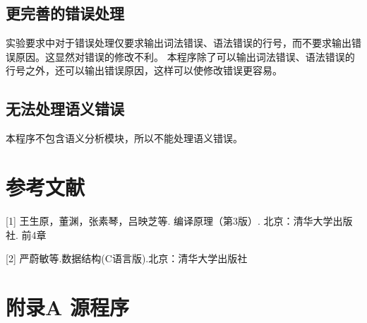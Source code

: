 \documentclass[supercite]{Experimental_Report}
\theoremstyle{definition}
\begin{document}
\subsection{更完善的错误处理}
实验要求中对于错误处理仅要求输出词法错误、语法错误的行号，而不要求输出错误原因。这显然对错误的修改不利。
本程序除了可以输出词法错误、语法错误的行号之外，还可以输出错误原因，这样可以使修改错误更容易。
\subsection{无法处理语义错误}
本程序不包含语义分析模块，所以不能处理语义错误。
\newpage
\section{参考文献}
[1] 王生原，董渊，张素琴，吕映芝等. 编译原理（第3版）. 北京：清华大学出版社. 前4章


[2] 严蔚敏等.数据结构(C语言版).北京：清华大学出版社

\section{附录A 源程序}
\end{document}
